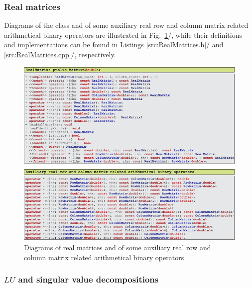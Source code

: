 \documentclass[b5paper, twosided]{book}
\newcommand{\CBlue}[1]{{\color[rgb]{0.0, 0.0, 0.9}{#1}}}
\DeclareRobustCommand{\mref}[1]{\ref{#1}{\relsize{-1}/\pageref{#1}}}
\begin{document}
\subsubsection{Real matrices}

Diagrams of the class \CBlue{RealMatrix} and of some auxiliary real row and column matrix related arithmetical binary operators are illustrated in Fig.\ \mref{fig:UMLRealMatrix}, while their definitions and implementations can  be found in Listings \mref{src:RealMatrices.h} and \mref{src:RealMatrices.cpp}, respectively.

\begin{figure}[!h]
    \centering
    \includegraphics[]{images/UMLRealMatrix.pdf}
    \caption{Diagrams of real matrices and of some auxiliary real row and column matrix related arithmetical binary operators}
    \label{fig:UMLRealMatrix}
\end{figure} 



\subsubsection{$LU$ and singular value decompositions}

%
\end{document}
